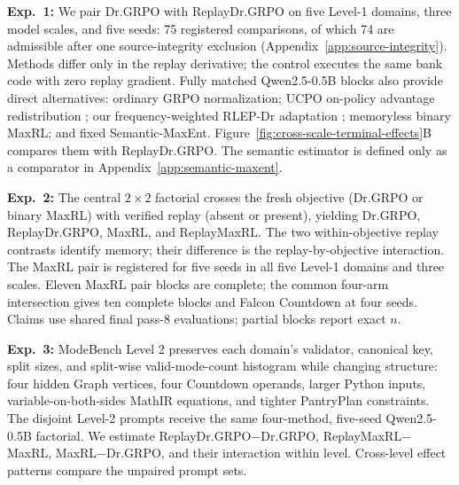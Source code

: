 \documentclass{article}
\newcommand{\1}{\mathbf 1}
\theoremstyle{remark}
\theoremstyle{definition}
\theoremstyle{plain}
\begin{document}
\label{sec:retention-design}
\noindent\textbf{Exp.~1:} We pair Dr.GRPO with ReplayDr.GRPO on five Level-1
domains, three model scales, and five seeds: 75 registered comparisons, of
which 74 are admissible after one source-integrity exclusion
(Appendix~\ref{app:source-integrity}). Methods differ only in the replay
derivative; the control executes the same bank code with zero replay gradient. Fully matched
Qwen2.5-0.5B blocks also provide direct alternatives: ordinary GRPO
normalization; UCPO on-policy advantage redistribution
\citep{lochab2026ucpo}; our frequency-weighted RLEP-Dr adaptation
\citep{zhang2025rlep}; memoryless binary MaxRL; and fixed Semantic-MaxEnt.
Figure~\ref{fig:cross-scale-terminal-effects}B compares them with
ReplayDr.GRPO. The semantic estimator is defined only as a comparator in
Appendix~\ref{app:semantic-maxent}.

\label{sec:factorial-design}
\noindent\textbf{Exp.~2:} The central \(2\times2\) factorial crosses the fresh
objective (Dr.GRPO or binary MaxRL) with verified replay (absent or present),
yielding Dr.GRPO, ReplayDr.GRPO, MaxRL, and ReplayMaxRL. The two
within-objective replay contrasts identify memory; their difference is the
replay-by-objective interaction. The MaxRL pair is registered for five seeds in
all five Level-1 domains and three scales. Eleven MaxRL pair blocks are complete;
the common four-arm intersection gives ten complete blocks and Falcon
Countdown at four seeds. Claims use shared final pass-8 evaluations; partial
blocks report exact \(n\).

\label{sec:levels-design}
\noindent\textbf{Exp.~3:} ModeBench Level 2 preserves each domain's validator,
canonical key, split sizes, and split-wise valid-mode-count histogram while
changing structure: four hidden Graph vertices, four Countdown operands,
larger Python inputs, variable-on-both-sides MathIR equations, and tighter PantryPlan
constraints. The disjoint Level-2 prompts receive the same four-method,
five-seed Qwen2.5-0.5B factorial. We estimate
ReplayDr.GRPO\(-\)Dr.GRPO, ReplayMaxRL\(-\)MaxRL,
MaxRL\(-\)Dr.GRPO, and their interaction within level. Cross-level effect
patterns compare the unpaired prompt sets.
\end{document}
